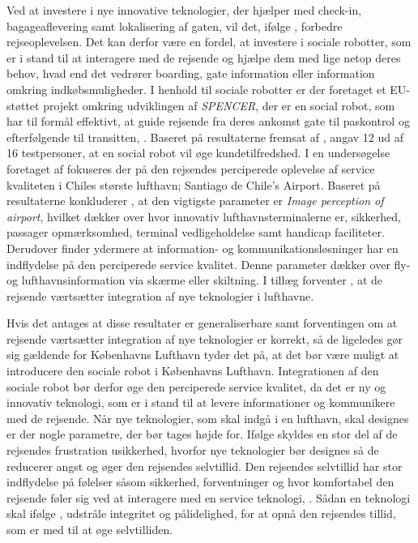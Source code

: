 Ved at investere i nye innovative teknologier, der hjælper med check-in, bagageaflevering samt lokalisering af gaten, vil det, ifølge \textcite[s. 352]{PDF:TheImpactOfTraveler}, forbedre rejseoplevelsen. Det kan derfor være en fordel, at investere i sociale robotter, som er i stand til at interagere med de rejsende og hjælpe dem med lige netop deres behov, hvad end det vedrører boarding, gate information eller information omkring indkøbsmuligheder. I henhold til sociale robotter er der foretaget et EU-støttet projekt omkring udviklingen af \textit{SPENCER}, der er en social robot, som har til formål effektivt, at guide rejsende fra deres ankomst gate til paskontrol og efterfølgende til transitten, \parencite[s. 609]{PDF:SpencerProject}. Baseret på resultaterne fremsat af \textcite[s. 150]{PDF:AGuideRobotAiport}, angav 12 ud af 16 testpersoner, at en social robot vil øge kundetilfredshed.     \blankline   
%
I en undersøgelse foretaget af \textcite{PDF:CustomerPerceptionOfService} fokuseres der på den rejsendes perciperede oplevelse af service kvaliteten i Chiles største lufthavn; Santiago de Chile's Airport. Baseret på resultaterne konkluderer \textcite[s. 213]{PDF:CustomerPerceptionOfService}, at den vigtigste parameter er \textit{Image perception of airport}, hvilket dækker over hvor innovativ lufthavnsterminalerne er, sikkerhed, passager opmærksomhed, terminal vedligeholdelse samt handicap faciliteter. Derudover finder \textcite[s. 213]{PDF:CustomerPerceptionOfService} ydermere at information- og kommunikationsløsninger har en indflydelse på den perciperede service kvalitet. Denne parameter dækker over fly- og lufthavnsinformation via skærme eller skiltning. I tillæg forventer \textcite[s. 210]{PDF:CustomerPerceptionOfService}, at de rejsende værtsætter integration af nye teknologier i lufthavne.   



Hvis det antages at disse resultater er generaliserbare samt forventingen om at rejsende værtsætter integration af nye teknologier er korrekt, så de ligeledes gør sig gældende for Københavns Lufthavn tyder det på, at det bør være muligt at introducere den sociale robot i Københavns Lufthavn. Integrationen af den sociale robot bør derfor øge den perciperede service kvalitet, da det er ny og innovativ teknologi, som er i stand til at levere informationer og kommunikere med de rejsende.  \blankline
%
Når nye teknologier, som skal indgå i en lufthavn, skal designes er der nogle parametre, der bør tages højde for. Ifølge \textcite[s. 352]{PDF:TheImpactOfTraveler} skyldes en stor del af de rejsendes frustration usikkerhed, hvorfor nye teknologier bør designes så de reducerer angst og øger den rejsendes selvtillid. Den rejsendes selvtillid har stor indflydelse på følelser såsom sikkerhed, forventninger og hvor komfortabel den rejsende føler sig ved at interagere med en service teknologi, \parencite[s. 353]{PDF:TheImpactOfTraveler}. Sådan en teknologi skal ifølge \textcite[s. 353]{PDF:TheImpactOfTraveler}, udstråle integritet og pålidelighed, for at opnå den rejsendes tillid, som er med til at øge selvtilliden.

